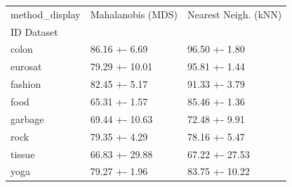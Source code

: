 \begin{tabular}{lll}
\toprule
method_display & Mahalanobis (MDS) & Nearest Neigh. (kNN) \\
ID Dataset &  &  \\
\midrule
colon & 86.16 +- 6.69 & 96.50 +- 1.80 \\
eurosat & 79.29 +- 10.01 & 95.81 +- 1.44 \\
fashion & 82.45 +- 5.17 & 91.33 +- 3.79 \\
food & 65.31 +- 1.57 & 85.46 +- 1.36 \\
garbage & 69.44 +- 10.63 & 72.48 +- 9.91 \\
rock & 79.35 +- 4.29 & 78.16 +- 5.47 \\
tissue & 66.83 +- 29.88 & 67.22 +- 27.53 \\
yoga & 79.27 +- 1.96 & 83.75 +- 10.22 \\
\bottomrule
\end{tabular}
